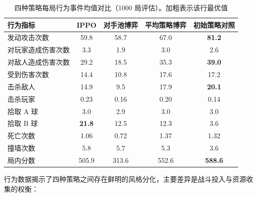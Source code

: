 \documentclass[12pt, a4paper, UTF8]{ctexart}
\numberwithin{equation}{section}
\begin{document}
\begin{table}[htbp]
  \centering
  \caption{ 四种策略每局行为事件均值对比（1000 局评估）。加粗表示该行最优值}
  \label{tab:behavior_profile}
  \begin{tabular}{lcccc}
    \toprule
    行为指标 & IPPO & 对手池博弈 & 平均策略博弈 & 初始策略对照 \\
    \midrule
    发动攻击次数           & 59.8 & 58.7 & 67.0 & \textbf{81.2} \\
    对玩家造成伤害次数         & 3.3  & 1.9  & 3.0  & 2.6 \\
    对敌人造成伤害次数         & 29.2 & 18.5 & 35.3 & \textbf{39.0} \\
    受到伤害次数               & 14.4 & 10.8 & 17.6 & 17.2 \\
    击杀敌人               & 14.9 & 9.5  & 17.9 & \textbf{20.1} \\
    击杀玩家               & 0.23 & 0.16 & 0.20 & 0.14 \\
    拾取 A 球              & 3.0  & 2.9  & 3.0  & 3.0  \\
    拾取 B 球              & \textbf{21.8} & 12.5 & 12.3 & 3.6  \\
    死亡次数               & 1.06 & 0.72 & 1.37 & 1.32 \\
    撞墙次数               & 5.8  & 5.7  & 5.3  & 3.6  \\
    局内分数               & 505.9 & 313.6 & 552.6 & \textbf{588.6} \\
    \bottomrule
  \end{tabular}
\end{table}

行为数据揭示了四种策略之间存在鲜明的风格分化，主要差异是战斗投入与资源收集的权衡：
\end{document}

